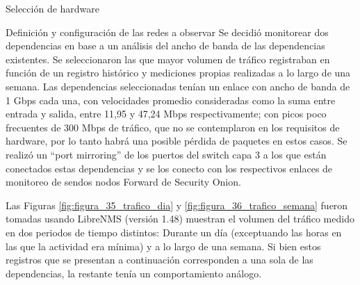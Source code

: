 \begin{section}{Selección de hardware}
        \begin{subsection}{Definición y configuración de las redes a observar}
            Se decidió monitorear dos dependencias en base a un análisis del ancho de banda de las dependencias existentes. Se seleccionaron las que mayor volumen de tráfico registraban en función de un registro histórico y mediciones propias realizadas a lo largo de una semana. Las dependencias seleccionadas tenían un enlace con ancho de banda de 1 Gbps cada una, con  velocidades promedio consideradas como la suma entre entrada y salida, entre 11,95 y 47,24 Mbps respectivamente; con picos poco frecuentes de 300 Mbps de tráfico, que no se contemplaron en los requisitos de hardware, por lo tanto habrá una posible pérdida de paquetes en estos casos. Se realizó un “port mirroring” de los puertos del switch capa 3 a los que están conectados estas dependencias y se los conecto con los respectivos enlaces de monitoreo de sendos nodos Forward de Security Onion. \par
            Las Figuras \ref{fig:figura_35_trafico_dia} y \ref{fig:figura_36_trafico_semana} fueron tomadas usando LibreNMS\cite{librenms} (versión 1.48)  muestran el volumen del tráfico medido en dos periodos de tiempo distintos: Durante un día (exceptuando las horas en las que la actividad era mínima) y a lo largo de una semana. Si bien estos registros que se presentan a continuación corresponden a una sola de las dependencias, la restante tenía un comportamiento análogo. \par
            

\end{subsection}
\end{section}
